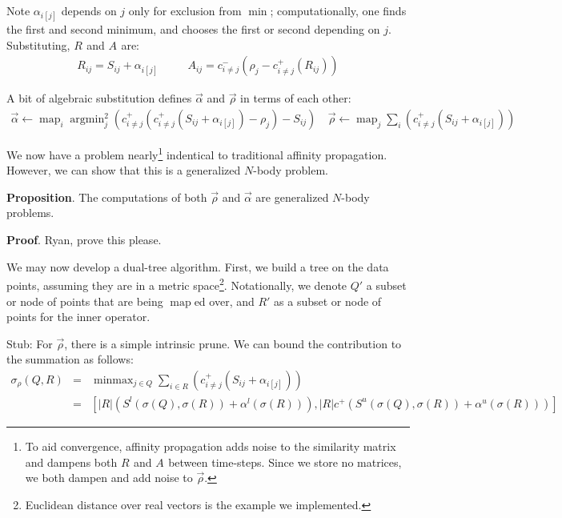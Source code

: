 \documentclass{article}
\DeclareMathOperator*{\argmin}{argmin}
\DeclareMathOperator*{\map}{map}
\DeclareMathOperator*{\minmax}{minmax}
\newcommand{\cpos}[2]{c^{+}_{#1 \neq #2}}
\newcommand{\cneg}[2]{c^{-}_{#1 \neq #2}}
\newcommand{\respo}[2]{R_{#1#2}}
\newcommand{\avail}[2]{A_{#1#2}}
\newcommand{\simil}[2]{S_{#1#2}}
\newcommand{\vecrho}{\vec{\rho}}
\newcommand{\vecalpha}{\vec{\alpha}}
\newcommand{\frho}[1]{\rho_{#1}}
\newcommand{\falphaj}[2]{\alpha_{#1[#2]}}
\newcommand{\falphamax}{\alpha^{u}}
\newcommand{\falphamin}{\alpha^{l}}
\begin{document}
\noindent Note $\falphaj{i}{j}$ depends on $j$ only for exclusion from $\min$; computationally, one finds the first and second minimum, and chooses the first or second depending on $j$.
Substituting, $\respo{}{}$ and $\avail{}{}$ are:
\begin{equation*}
  \begin{array}{lcccr}
    \respo{i}{j} = \simil{i}{j} + \falphaj{i}{j}
    &\quad&
    \avail{i}{j} = \cneg{i}{j} (\frho{j} - \cpos{i}{j}(\respo{i}{j}) )
  \end{array}
\end{equation*}

\noindent 
A bit of algebraic substitution defines $\vecalpha$ and $\vecrho$ in terms of each other:
\begin{equation*}
  \begin{array}{lr}
    \vecalpha \gets \map_{i} \argmin^2_{j} \left( \cpos{i}{j}(\cpos{i}{j}(\simil{i}{j} + \falphaj{i}{j}) - \frho{j}) - \simil{i}{j} \right)
    &~
    \vecrho \gets \map_{j} \sum_{i} \left( \cpos{i}{j}(\simil{i}{j} + \falphaj{i}{j}) \right)
  \end{array}
\end{equation*}

We now have a problem nearly\footnote{To aid convergence, affinity propagation adds noise to the similarity matrix and dampens both $\respo{}{}$ and $\avail{}{}$ between time-steps.  Since we store no matrices, we both dampen and add noise to $\vecrho$.} indentical to traditional affinity propagation.
However, we can show that this is a generalized $N$-body problem.

{\bf Proposition}.
The computations of both $\vecrho$ and $\vecalpha$ are generalized $N$-body problems.

{\bf Proof}.
Ryan, prove this please.

We may now develop a dual-tree algorithm.
First, we build a tree on the data points, assuming they are in a metric space\footnote{Euclidean distance over real vectors is the example we implemented.}.
Notationally, we denote $Q'$ a subset or node of points that are being $\map$ed over, and $R'$ as a subset or node of points for the inner operator.

Stub: For $\vecrho$, there is a simple intrinsic prune.
We can bound the contribution to the summation as follows:
$$
  \begin{array}{rcl}
    \sigma_{\rho}(Q,R) &=& \minmax_{j \in Q} \sum_{i \in R} ( \cpos{i}{j}(\simil{i}{j} + \falphaj{i}{j}) )
    \\ &=& [|R|(S^l(\sigma(Q),\sigma(R)) + \falphamin(\sigma(R))),
            |R|c^{+}(S^u(\sigma(Q),\sigma(R)) + \falphamax(\sigma(R)))]
  \end{array}
$$
\end{document}
